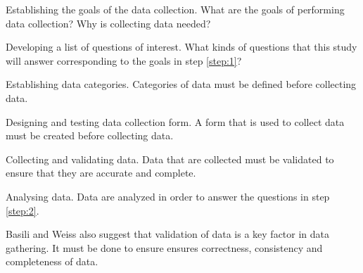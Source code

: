 \begin{step} \label{step:1}
Establishing the goals of the data collection. What are the goals of performing data collection? Why is collecting data needed?
\end{step}

\begin{step} \label{step:2}
Developing a list of questions of interest. What kinds of questions that this study will answer corresponding to the goals in step \ref{step:1}?
\end{step}

\begin{step} \label{step:3}
Establishing data categories. Categories of data must be defined before collecting data.
\end{step}

\begin{step} \label{step:4}
Designing and testing data collection form. A form that is used to collect data must be created before collecting data.
\end{step}

\begin{step} \label{step:5}
Collecting and validating data. Data that are collected must be validated to ensure that they are accurate and complete.
\end{step}

\begin{step} \label{step:6}
Analysing data. Data are analyzed in order to answer the questions in step \ref{step:2}.
\end{step}

Basili and Weiss also suggest that validation of data is a key factor in data gathering. It must be done to ensure ensures correctness, consistency and completeness of data.
